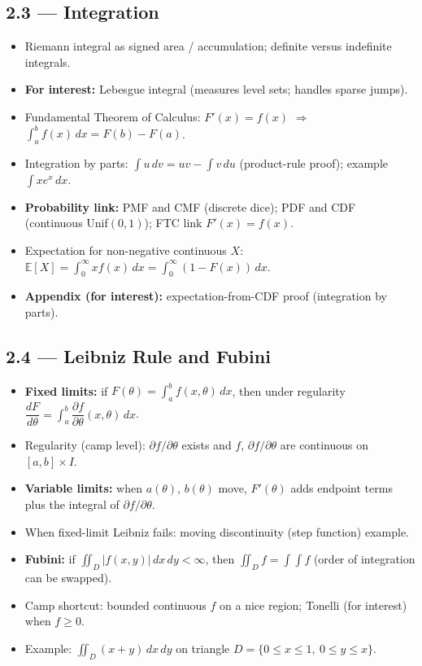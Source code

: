 \documentclass[11pt,a4paper]{article}
\begin{document}
\subsection{2.3 --- Integration}
\begin{itemize}[leftmargin=*]
    \item Riemann integral as signed area / accumulation; definite versus indefinite integrals.
    \item \textbf{For interest:} Lebesgue integral (measures level sets; handles sparse jumps).
    \item Fundamental Theorem of Calculus: $F'(x)=f(x)$ $\Rightarrow$
      $\displaystyle\int_a^b f(x)\,dx=F(b)-F(a)$.
    \item Integration by parts: $\displaystyle\int u\,dv=uv-\int v\,du$ (product-rule proof);
      example $\displaystyle\int x e^x\,dx$.
    \item \textbf{Probability link:} PMF and CMF (discrete dice); PDF and CDF (continuous Unif$(0,1)$);
      FTC link $F'(x)=f(x)$.
    \item Expectation for non-negative continuous $X$:
      $\mathbb{E}[X]=\displaystyle\int_0^\infty x f(x)\,dx=\int_0^\infty(1-F(x))\,dx$.
    \item \textbf{Appendix (for interest):} expectation-from-CDF proof (integration by parts).
\end{itemize}

\subsection{2.4 --- Leibniz Rule and Fubini}
\begin{itemize}[leftmargin=*]
    \item \textbf{Fixed limits:} if $F(\theta)=\displaystyle\int_a^b f(x,\theta)\,dx$, then under regularity
      $\dfrac{dF}{d\theta}=\displaystyle\int_a^b \dfrac{\partial f}{\partial\theta}(x,\theta)\,dx$.
    \item Regularity (camp level): $\partial f/\partial\theta$ exists and $f$, $\partial f/\partial\theta$
      are continuous on $[a,b]\times I$.
    \item \textbf{Variable limits:} when $a(\theta)$, $b(\theta)$ move,
      $F'(\theta)$ adds endpoint terms plus the integral of $\partial f/\partial\theta$.
    \item When fixed-limit Leibniz fails: moving discontinuity (step function) example.
    \item \textbf{Fubini:} if $\displaystyle\iint_D |f(x,y)|\,dx\,dy<\infty$, then
      $\displaystyle\iint_D f=\int\!\int f$ (order of integration can be swapped).
    \item Camp shortcut: bounded continuous $f$ on a nice region; Tonelli (for interest) when $f\ge 0$.
    \item Example: $\displaystyle\iint_D (x+y)\,dx\,dy$ on triangle $D=\{0\le x\le 1,\ 0\le y\le x\}$.
\end{itemize}
\end{document}
